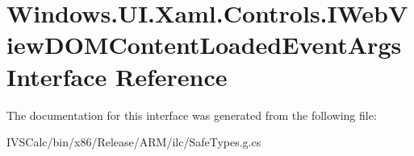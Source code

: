 \hypertarget{interface_windows_1_1_u_i_1_1_xaml_1_1_controls_1_1_i_web_view_d_o_m_content_loaded_event_args}{}\section{Windows.\+U\+I.\+Xaml.\+Controls.\+I\+Web\+View\+D\+O\+M\+Content\+Loaded\+Event\+Args Interface Reference}
\label{interface_windows_1_1_u_i_1_1_xaml_1_1_controls_1_1_i_web_view_d_o_m_content_loaded_event_args}


The documentation for this interface was generated from the following file\+:\begin{DoxyCompactItemize}
\item 
I\+V\+S\+Calc/bin/x86/\+Release/\+A\+R\+M/ilc/Safe\+Types.\+g.\+cs\end{DoxyCompactItemize}
